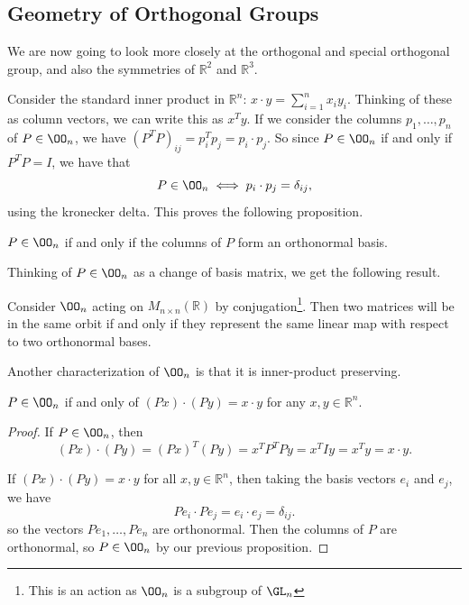 \documentclass[a4paper]{scrartcl}
\begin{document}
\subsection{Geometry of Orthogonal Groups}

We are now going to look more closely at the orthogonal and special orthogonal group, and also the symmetries of $\mathbb{R}^2$ and $\mathbb{R}^3$.

Consider the standard inner product in $\mathbb{R}^n$: $x \cdot y = \sum_{i = 1}^n x_i y_i$. Thinking of these as column vectors, we can write this as $x^T y$. If we consider the columns $p_1, \dots, p_n$ of $P \in \OO_n$, we have $(P^T P)_{ij} = p_i^T p_j = p_i \cdot p_j$. So since $P \in \OO_n$ if and only if $P^T P = I$, we have that
$$
P \in \OO_n \iff p_i \cdot p_j = \delta_{ij},
$$
using the kronecker delta. 
This proves the following proposition.

\begin{proposition}
	$P \in \OO_n$ if and only if the columns of $P$ form an orthonormal basis.
\end{proposition}

Thinking of $P \in \OO_n$ as a change of basis matrix, we get the following result.

\begin{proposition}
	Consider $\OO_n$ acting on $M_{n \times n}(\mathbb{R})$ by conjugation\footnote{This is an action as $\OO_n$ is a subgroup of $\GL_n$}. Then two matrices will be in the same orbit if and only if they represent the same linear map with respect to two orthonormal bases.
\end{proposition}

Another characterization of $\OO_n$ is that it is inner-product preserving.

\begin{proposition}
	$P \in \OO_n$ if and only of $(Px) \cdot (Py) = x \cdot y$ for any $x, y \in \mathbb{R}^n$.
\end{proposition}
\begin{proof}
	If $P \in \OO_n$, then 
	$$
	(Px) \cdot (Py) = (Px)^T (Py) = x^T P^T P y = x^T I y = x^Ty = x \cdot y.
	$$

	If $(Px) \cdot (Py) = x \cdot y$ for all $x, y \in \mathbb{R}^n$, then taking the basis vectors $e_i$ and $e_j$, we have
	$$
	Pe_i \cdot Pe_j = e_i \cdot e_j = \delta_{ij}.
	$$
	so the vectors $Pe_1,\dots, Pe_n$ are orthonormal. Then the columns of $P$ are orthonormal, so $P \in \OO_n$ by our previous proposition. 
\end{proof}
\end{document}
